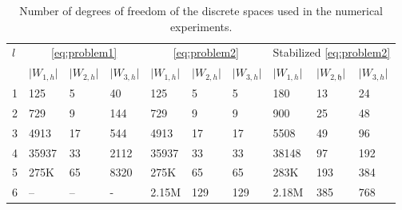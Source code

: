 \begin{table}[h!]
\begin{center}
  \scriptsize{
    \begin{tabular}{l|lll|lll|lll}
      \hline
      \multirow{2}{*}{$l$} & \multicolumn{3}{c|}{\eqref{eq:problem1}} & \multicolumn{3}{c|}{\eqref{eq:problem2}} & \multicolumn{3}{c}{ Stabilized \eqref{eq:problem2}}\\
      \cline{2-10}
       & $\lvert W_{1, h}\rvert$  & $\lvert W_{2, h}\rvert$ & $\lvert W_{3, h}\rvert$ 
       & $\lvert W_{1, h}\rvert$  & $\lvert W_{2, h}\rvert$ & $\lvert W_{3, h}\rvert$
       & $\lvert W_{1, h}\rvert$  & $\lvert W_{2, \mathfrak{h}}\rvert$ & $\lvert W_{3, h}\rvert$\\
      \hline
     1& 125    & 5  & 40   & 125     & 5   & 5   & 180     & 13  & 24  \\
     2& 729    & 9  & 144  & 729     & 9   & 9   & 900     & 25  & 48  \\
     3& 4913   & 17 & 544  & 4913    & 17  & 17  & 5508    & 49  & 96  \\
     4& 35937  & 33 & 2112 & 35937   & 33  & 33  & 38148   & 97  & 192 \\
     5& 275K & 65 & 8320 & 275K  & 65  & 65  & 283K  & 193 & 384 \\
     6& --     & -- & -    & 2.15M & 129 & 129 & 2.18M & 385 & 768 \\
     \hline
    \end{tabular}
    }
\end{center}
    \caption{Number of degrees of freedom of the discrete spaces used in the numerical experiments.}
    \label{tab:dof}
\end{table}

